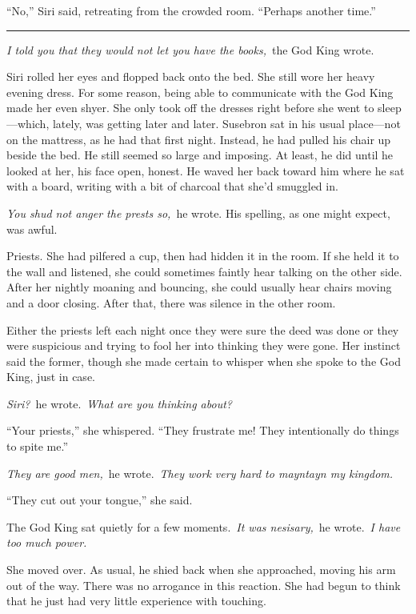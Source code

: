 “No,” Siri said, retreating from the crowded room. “Perhaps another time.”

\bigskip \hrule \bigskip

\textit{I told you that they would not let you have the books,}~the God King wrote.

Siri rolled her eyes and flopped back onto the bed. She still wore her heavy evening dress. For some reason, being able to communicate with the God King made her even shyer. She only took off the dresses right before she went to sleep—which, lately, was getting later and later. Susebron sat in his usual place—not on the mattress, as he had that first night. Instead, he had pulled his chair up beside the bed. He still seemed so large and imposing. At least, he did until he looked at her, his face open, honest. He waved her back toward him where he sat with a board, writing with a bit of charcoal that she’d smuggled in.

\textit{You shud not anger the prests so,}~he wrote. His spelling, as one might expect, was awful.

Priests. She had pilfered a cup, then had hidden it in the room. If she held it to the wall and listened, she could sometimes faintly hear talking on the other side. After her nightly moaning and bouncing, she could usually hear chairs moving and a door closing. After that, there was silence in the other room.

Either the priests left each night once they were sure the deed was done or they were suspicious and trying to fool her into thinking they were gone. Her instinct said the former, though she made certain to whisper when she spoke to the God King, just in case.

\textit{Siri?}~he wrote.~\textit{What are you thinking about?}

“Your priests,” she whispered. “They frustrate me! They intentionally do things to spite me.”

\textit{They are good men,}~he wrote.~\textit{They work very hard to mayntayn my kingdom.}

“They cut out your tongue,” she said.

The God King sat quietly for a few moments.~\textit{It was nesisary,}~he wrote.~\textit{I have too much power.}

She moved over. As usual, he shied back when she approached, moving his arm out of the way. There was no arrogance in this reaction. She had begun to think that he just had very little experience with touching.

